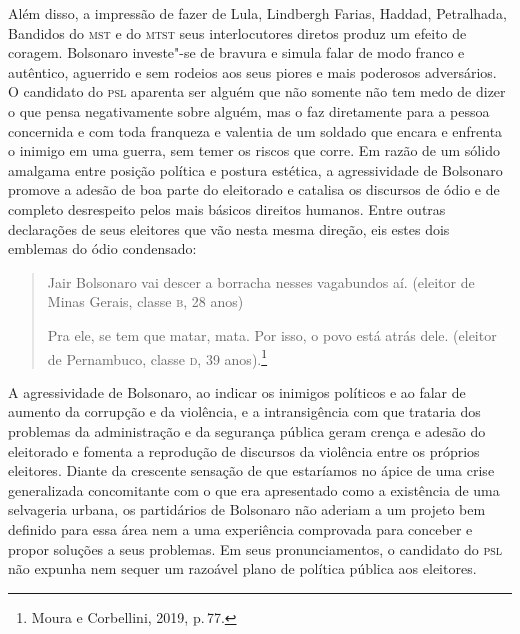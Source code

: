 Além disso, a impressão de fazer de Lula, Lindbergh Farias, Haddad,
Petralhada, Bandidos do \textsc{mst} e do \textsc{mtst} seus interlocutores diretos produz
um efeito de coragem. Bolsonaro investe"-se de bravura e simula falar de
modo franco e autêntico, aguerrido e sem rodeios aos seus piores e mais
poderosos adversários. O candidato do \textsc{psl} aparenta ser alguém que não
somente não tem medo de dizer o que pensa negativamente sobre alguém,
mas o faz diretamente para a pessoa concernida e com toda franqueza e
valentia de um soldado que encara e enfrenta o inimigo em uma guerra,
sem temer os riscos que corre. Em razão de um sólido amalgama entre
posição política e postura estética, a agressividade de Bolsonaro
promove a adesão de boa parte do eleitorado e catalisa os discursos de
ódio e de completo desrespeito pelos mais básicos direitos humanos.
Entre outras declarações de seus eleitores que vão nesta mesma direção,
eis estes dois emblemas do ódio condensado:

\begin{quote}
Jair Bolsonaro vai descer a borracha nesses vagabundos aí. (eleitor de
Minas Gerais, classe \textsc{b}, 28 anos)

Pra ele, se tem que matar, mata. Por isso, o povo está atrás dele.
(eleitor de Pernambuco, classe \textsc{d}, 39 anos).\footnote{Moura e Corbellini,
  2019, p.\,77.}
\end{quote}

A agressividade de Bolsonaro, ao indicar os inimigos políticos e ao
falar de aumento da corrupção e da violência, e a intransigência com que
trataria dos problemas da administração e da segurança pública geram
crença e adesão do eleitorado e fomenta a reprodução de discursos da
violência entre os próprios eleitores. Diante da crescente sensação de
que estaríamos no ápice de uma crise generalizada concomitante com o que
era apresentado como a existência de uma selvageria urbana, os
partidários de Bolsonaro não aderiam a um projeto bem definido para essa
área nem a uma experiência comprovada para conceber e propor soluções a
seus problemas. Em seus pronunciamentos, o candidato do \textsc{psl} não expunha
nem sequer um razoável plano de política pública aos eleitores.

